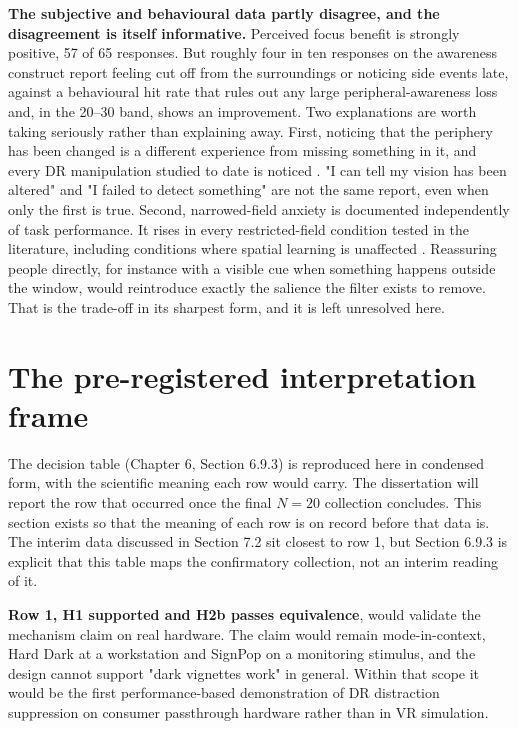\textbf{The subjective and behavioural data partly disagree, and the disagreement is itself
informative.} Perceived focus benefit is strongly positive, 57 of 65 responses. But roughly four in
ten responses on the awareness construct report feeling cut off from the surroundings or noticing
side events late, against a behavioural hit rate that rules out any large peripheral-awareness loss
and, in the 20--30\textdegree{} band, shows an improvement. Two explanations are worth taking seriously rather than
explaining away. First, noticing
that the periphery has been changed is a different experience from missing something in it, and every
DR manipulation studied to date is noticed \citep{sutton2022}. "I can tell my vision has been
altered" and "I failed to detect something" are not the same report, even when only the first is
true. Second, narrowed-field anxiety is documented independently of task performance. It rises in
every restricted-field condition tested in the literature, including conditions where spatial learning
is unaffected \citep{barhorstcates2016}. Reassuring people directly, for instance with a visible
cue when something happens outside the window, would reintroduce exactly the salience the filter
exists to remove. That is the trade-off in its sharpest form, and it is left unresolved here.

\section{The pre-registered interpretation frame}

The decision table (Chapter 6, Section 6.9.3) is reproduced here in condensed form, with the
scientific meaning each row would carry. The dissertation will report the row that occurred once the
final $N = 20$ collection concludes. This section exists so that the meaning of each row is on record
before that data is. The interim data discussed in Section 7.2 sit closest to row 1, but Section 6.9.3
is explicit that this table maps the confirmatory collection, not an interim reading of it.

\textbf{Row 1, H1 supported and H2b passes equivalence}, would validate the mechanism claim on real
hardware. The claim would remain mode-in-context, Hard Dark at a workstation and SignPop on a
monitoring stimulus, and the design cannot support "dark vignettes work" in general. Within that
scope it would be the first performance-based demonstration of DR distraction suppression on consumer
passthrough hardware rather than in VR simulation.


